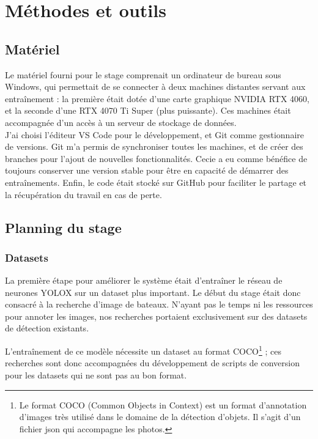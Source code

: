 \chapter{Méthodes et outils}

\section{Matériel}

Le matériel fourni pour le stage comprenait un ordinateur de bureau sous Windows,
qui permettait de se connecter à deux machines distantes servant aux entraînement :
la première était dotée d'une carte graphique NVIDIA RTX 4060, et la seconde d'une
RTX 4070 Ti Super (plus puissante). Ces machines était accompagnée d'un accès à un serveur
de stockage de données. \\

J'ai choisi l'éditeur VS Code pour le développement, et Git comme gestionnaire de versions.
Git m'a permis de synchroniser toutes les machines, et de créer des branches pour
l'ajout de nouvelles fonctionnalités. Cecie a eu comme bénéfice de toujours
conserver une version stable pour être en capacité de démarrer des entraînements.
Enfin, le code était stocké sur GitHub pour faciliter le partage
et la récupération du travail en cas de perte. \\

\section{Planning du stage}

\subsection{Datasets}

La première étape pour améliorer le système était d'entraîner le réseau de neurones YOLOX
sur un dataset plus important. Le début du stage était donc consacré à la recherche
d'image de bateaux. N'ayant pas le temps ni les ressources pour annoter les images,
nos recherches portaient exclusivement sur des datasets de détection existants.

L'entraînement de ce modèle nécessite un dataset au
format COCO\footnote{Le format COCO (Common Objects in Context) est un format d'annotation
d'images très utilisé dans le domaine de la détection d'objets. Il s'agit d'un fichier
json qui accompagne les photos.} ; ces recherches sont donc accompagnées du développement
de scripts de conversion pour les datasets qui ne sont pas au bon format.\\

